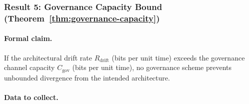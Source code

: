 \documentclass[11pt, a4paper, logo, copyright]{googledeepmind}
\begin{document}
\subsubsection{Result 5: Governance Capacity Bound (Theorem~\ref{thm:governance-capacity})}

\paragraph{Formal claim.} If the architectural drift rate $R_{\text{drift}}$ (bits per unit time) exceeds the governance channel capacity $C_{\text{gov}}$ (bits per unit time), no governance scheme prevents unbounded divergence from the intended architecture.

\paragraph{Data to collect.}
\end{document}
